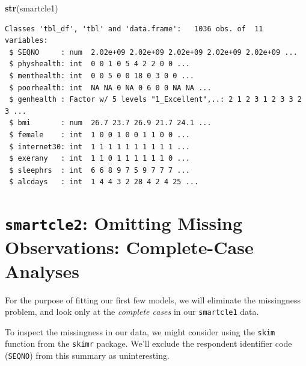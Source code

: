 \documentclass[]{book}
\newenvironment{Shaded}{\begin{snugshade}}{\end{snugshade}}
\newcommand{\KeywordTok}[1]{\textcolor[rgb]{0.13,0.29,0.53}{\textbf{#1}}}
\newcommand{\StringTok}[1]{\textcolor[rgb]{0.31,0.60,0.02}{#1}}
\newcommand{\OperatorTok}[1]{\textcolor[rgb]{0.81,0.36,0.00}{\textbf{#1}}}
\newcommand{\NormalTok}[1]{#1}
\theoremstyle{definition}
\theoremstyle{definition}
\theoremstyle{definition}
\theoremstyle{remark}
\begin{document}
\begin{Shaded}
\begin{Highlighting}[]
\KeywordTok{str}\NormalTok{(smartcle1)}
\end{Highlighting}
\end{Shaded}

\begin{verbatim}
Classes 'tbl_df', 'tbl' and 'data.frame':   1036 obs. of  11 variables:
 $ SEQNO     : num  2.02e+09 2.02e+09 2.02e+09 2.02e+09 2.02e+09 ...
 $ physhealth: int  0 0 1 0 5 4 2 2 0 0 ...
 $ menthealth: int  0 0 5 0 0 18 0 3 0 0 ...
 $ poorhealth: int  NA NA 0 NA 0 6 0 0 NA NA ...
 $ genhealth : Factor w/ 5 levels "1_Excellent",..: 2 1 2 3 1 2 3 3 2 3 ...
 $ bmi       : num  26.7 23.7 26.9 21.7 24.1 ...
 $ female    : int  1 0 0 1 0 0 1 1 0 0 ...
 $ internet30: int  1 1 1 1 1 1 1 1 1 1 ...
 $ exerany   : int  1 1 0 1 1 1 1 1 1 0 ...
 $ sleephrs  : int  6 6 8 9 7 5 9 7 7 7 ...
 $ alcdays   : int  1 4 4 3 2 28 4 2 4 25 ...
\end{verbatim}

\section{\texorpdfstring{\texttt{smartcle2}: Omitting Missing
Observations: Complete-Case
Analyses}{smartcle2: Omitting Missing Observations: Complete-Case Analyses}}\label{smartcle2-omitting-missing-observations-complete-case-analyses}

For the purpose of fitting our first few models, we will eliminate the
missingness problem, and look only at the \emph{complete cases} in our
\texttt{smartcle1} data.

To inspect the missingness in our data, we might consider using the
\texttt{skim} function from the \texttt{skimr} package. We'll exclude
the respondent identifier code (\texttt{SEQNO}) from this summary as
uninteresting.

\begin{Shaded}
\end{Shaded}
\end{document}
